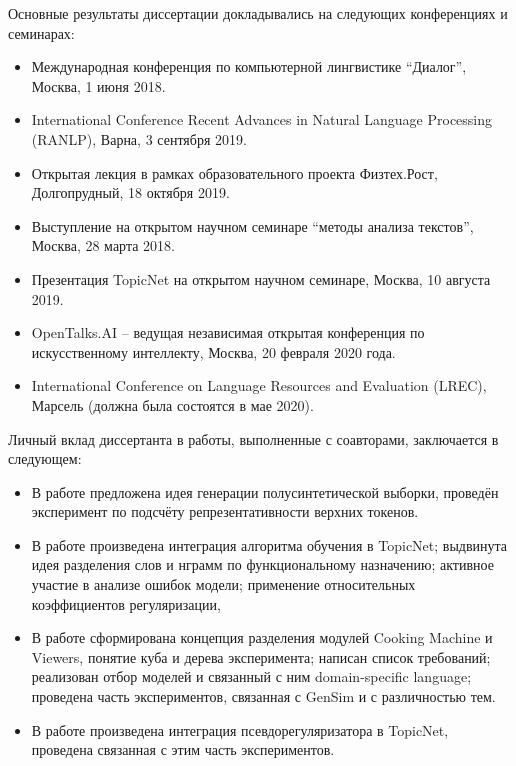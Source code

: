{\probation}
Основные результаты диссертации докладывались на следующих конференциях и семинарах:
\begin{itemize}
    \item Международная конференция по компьютерной лингвистике “Диалог”, Москва, 1 июня 2018.
    \item International Conference Recent Advances in Natural Language Processing (RANLP), Варна, 3 сентября 2019.
    \item Открытая лекция в рамках образовательного проекта Физтех.Рост, Долгопрудный, 18 октября 2019.
    \item Выступление на открытом научном семинаре ``методы анализа текстов'', Москва, 28 марта 2018.
    \item Презентация TopicNet на открытом научном семинаре, Москва, 10 августа 2019.
    \item OpenTalks.AI – ведущая независимая открытая конференция по искусственному интеллекту, Москва, 20 февраля 2020 года.
    \item International Conference on Language Resources and Evaluation (LREC), Марсель (должна была состоятся в мае 2020).
\end{itemize}

{\contribution} Личный вклад диссертанта в работы, выполненные с
соавторами, заключается в следующем:
\begin{itemize}
    \item В работе \cite{intracoh} предложена идея генерации полусинтетической выборки, проведён эксперимент по подсчёту репрезентативности верхних токенов.
    \item В работе \cite{popov_hier} произведена интеграция алгоритма обучения в TopicNet; выдвинута идея разделения слов и нграмм по функциональному назначению; активное участие в анализе ошибок модели; применение относительных коэффициентов регуляризации,
    \item В работе \cite{bulatov2020topicnet} сформирована концепция разделения модулей Cooking Machine и Viewers, понятие куба и дерева эксперимента; написан список требований; реализован отбор моделей и связанный с ним domain-specific language; проведена часть экспериментов, связанная с GenSim и с различностью тем.
    \item В работе \cite{thetaless} произведена интеграция псевдорегуляризатора в TopicNet, проведена связанная с этим часть экспериментов.
\end{itemize}

